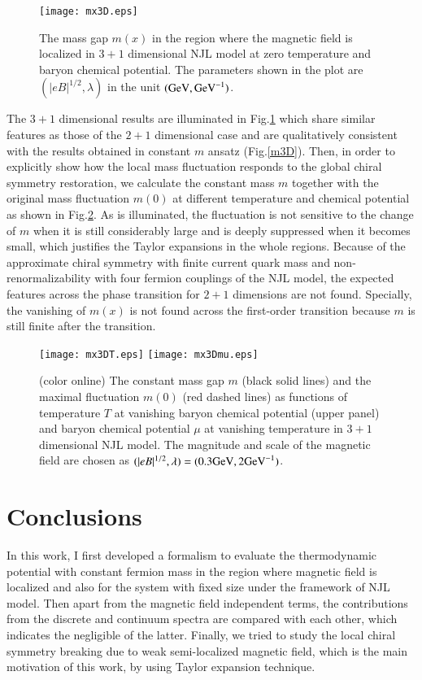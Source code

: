 \documentclass[aps,prd,amsmath,two column,amssymb,showpacs]{revtex4}
\begin{document}
\begin{figure}[!htb]
	\begin{center}
		\texttt{[image: mx3D.eps]}
		\caption{The mass gap $m(x)$ in the region where the magnetic field is localized in $3+1$ dimensional NJL model at zero temperature and baryon chemical potential. The parameters shown in the plot are $(|eB|^{1/2},\lambda)$ in the unit $({\rm GeV},{\rm GeV}^{-1})$.}\label{mx3}
	\end{center}
\end{figure}
The $3+1$ dimensional results are illuminated in Fig.\ref{mx3} which share similar features as those of the $2+1$ dimensional case and are qualitatively consistent with the results obtained in constant $m$ ansatz (Fig.\ref{m3D}). Then, in order to explicitly show how the local mass fluctuation responds to the global chiral symmetry restoration, we calculate the constant mass $m$ together with the original mass fluctuation $m(0)$ at different temperature and chemical potential as shown in Fig.\ref{mTmu}. As is illuminated, the fluctuation is not sensitive to the change of $m$ when it is still considerably large and is deeply suppressed when it becomes small, which justifies the Taylor expansions in the whole regions. Because of the approximate chiral symmetry with finite current quark mass and non-renormalizability with four fermion couplings of the NJL model, the expected features across the phase transition for $2+1$ dimensions are not found. Specially, the vanishing of $m(x)$ is not found across the first-order transition because $m$ is still finite after the transition.
\begin{figure}[!htb]
	\begin{center}
		\texttt{[image: mx3DT.eps]}
		\texttt{[image: mx3Dmu.eps]}
		\caption{(color online) The constant mass gap $m$ (black solid lines) and the maximal fluctuation $m(0)$ (red dashed lines) as functions of temperature $T$ at vanishing baryon chemical potential (upper panel) and baryon chemical potential $\mu$ at vanishing temperature in $3+1$ dimensional NJL model. The magnitude and scale of the magnetic field are chosen as $(|eB|^{1/2},\lambda)=(0.3{\rm GeV},2 {\rm GeV}^{-1})$.}\label{mTmu}
	\end{center}
\end{figure}

\section{Conclusions}\label{conclusions}
In this work, I first developed a formalism to evaluate the thermodynamic potential with constant fermion mass in the region where magnetic field is localized and also for the system with fixed size under the framework of NJL model. Then apart from the magnetic field independent terms, the contributions from the discrete and continuum spectra are compared with each other, which indicates the negligible of the latter. Finally, we tried to study the local chiral symmetry breaking due to weak semi-localized magnetic field, which is the main motivation of this work, by using Taylor expansion technique. 
\end{document}
